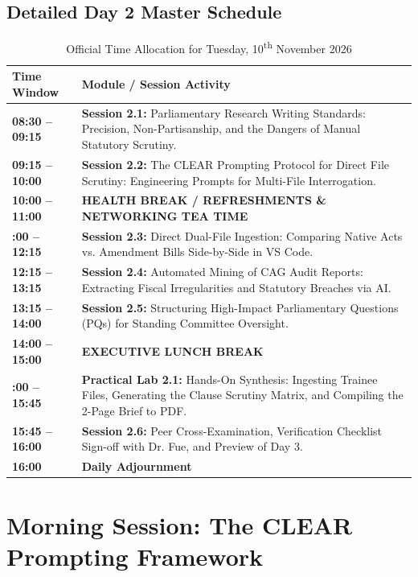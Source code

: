 \documentclass[11pt, a4paper]{report}
\begin{document}
\section{Detailed Day 2 Master Schedule}
\begin{table}[htbp]
\centering
\caption{Official Time Allocation for Tuesday, 10\textsuperscript{th} November 2026}
\vspace{0.2cm}
\begin{tabular}{@{}>{\bfseries}lp{11.5cm}@{}}
\toprule
Time Window & Module / Session Activity \\
\midrule
08:30 -- 09:15 & \textbf{Session 2.1:} Parliamentary Research Writing Standards: Precision, Non-Partisanship, and the Dangers of Manual Statutory Scrutiny. \\
09:15 -- 10:00 & \textbf{Session 2.2:} The CLEAR Prompting Protocol for Direct File Scrutiny: Engineering Prompts for Multi-File Interrogation. \\
\addlinespace
\textbf{10:00 -- 11:00} & \textbf{HEALTH BREAK / REFRESHMENTS \& NETWORKING TEA TIME} \\
\addlinespace
11:00 -- 12:15 & \textbf{Session 2.3:} Direct Dual-File Ingestion: Comparing Native Acts vs. Amendment Bills Side-by-Side in VS Code. \\
12:15 -- 13:15 & \textbf{Session 2.4:} Automated Mining of CAG Audit Reports: Extracting Fiscal Irregularities and Statutory Breaches via AI. \\
13:15 -- 14:00 & \textbf{Session 2.5:} Structuring High-Impact Parliamentary Questions (PQs) for Standing Committee Oversight. \\
\addlinespace
\textbf{14:00 -- 15:00} & \textbf{EXECUTIVE LUNCH BREAK} \\
\addlinespace
15:00 -- 15:45 & \textbf{Practical Lab 2.1:} Hands-On Synthesis: Ingesting Trainee Files, Generating the Clause Scrutiny Matrix, and Compiling the 2-Page Brief to PDF. \\
15:45 -- 16:00 & \textbf{Session 2.6:} Peer Cross-Examination, Verification Checklist Sign-off with Dr. Fue, and Preview of Day 3. \\
\textbf{16:00} & \textbf{Daily Adjournment} \\
\bottomrule
\end{tabular}
\end{table}

\newpage

\chapter{Morning Session: The CLEAR Prompting Framework}
\end{document}
